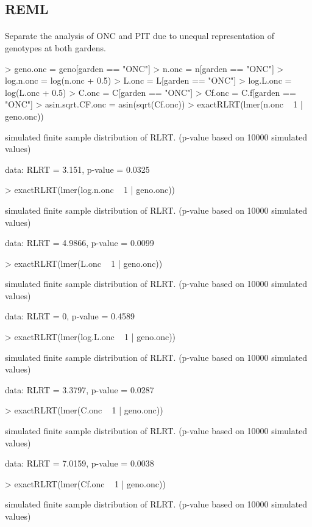 \documentclass[11pt]{amsart}
\begin{document}
\subsection{REML}
\paragraph{}Separate the analysis of ONC and PIT due to unequal
representation of genotypes at both gardens. 

\begin{Schunk}
\begin{Sinput}
> geno.onc = geno[garden == "ONC"]
> n.onc = n[garden == "ONC"]
> log.n.onc = log(n.onc + 0.5)
> L.onc = L[garden == "ONC"]
> log.L.onc = log(L.onc + 0.5)
> C.onc = C[garden == "ONC"]
> Cf.onc = C.f[garden == "ONC"]
> asin.sqrt.CF.onc = asin(sqrt(Cf.onc))
> exactRLRT(lmer(n.onc ~ 1 | geno.onc))
\end{Sinput}
	simulated finite sample distribution of RLRT.  (p-value based on 10000
	simulated values)

data:  
RLRT = 3.151, p-value = 0.0325\begin{Sinput}
> exactRLRT(lmer(log.n.onc ~ 1 | geno.onc))
\end{Sinput}
	simulated finite sample distribution of RLRT.  (p-value based on 10000
	simulated values)

data:  
RLRT = 4.9866, p-value = 0.0099\begin{Sinput}
> exactRLRT(lmer(L.onc ~ 1 | geno.onc))
\end{Sinput}
	simulated finite sample distribution of RLRT.  (p-value based on 10000
	simulated values)

data:  
RLRT = 0, p-value = 0.4589\begin{Sinput}
> exactRLRT(lmer(log.L.onc ~ 1 | geno.onc))
\end{Sinput}
	simulated finite sample distribution of RLRT.  (p-value based on 10000
	simulated values)

data:  
RLRT = 3.3797, p-value = 0.0287\begin{Sinput}
> exactRLRT(lmer(C.onc ~ 1 | geno.onc))
\end{Sinput}
	simulated finite sample distribution of RLRT.  (p-value based on 10000
	simulated values)

data:  
RLRT = 7.0159, p-value = 0.0038\begin{Sinput}
> exactRLRT(lmer(Cf.onc ~ 1 | geno.onc))
\end{Sinput}
	simulated finite sample distribution of RLRT.  (p-value based on 10000
	simulated values)


\end{Schunk}
\end{document}
